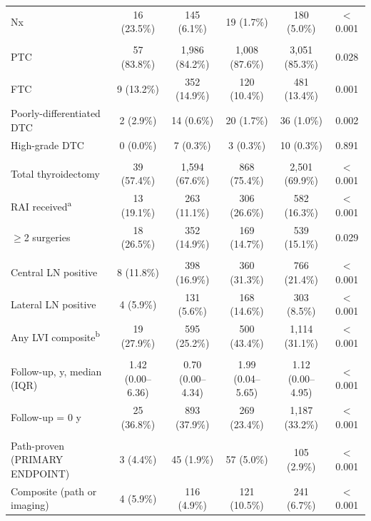 \begin{landscape}
\begin{table}[htbp]
\begin{threeparttable}
\begin{tabular}{@{}lccccc@{}}
\quad Nx & 16 (23.5\%) & 145 (6.1\%) & 19 (1.7\%) & 180 (5.0\%) & $<$0.001 \\
\addlinespace
\multicolumn{6}{l}{\textit{Histology}} \\
\quad PTC & 57 (83.8\%) & 1{,}986 (84.2\%) & 1{,}008 (87.6\%) & 3{,}051 (85.3\%) & 0.028 \\
\quad FTC & 9 (13.2\%) & 352 (14.9\%) & 120 (10.4\%) & 481 (13.4\%) & 0.001 \\
\quad Poorly-differentiated DTC & 2 (2.9\%) & 14 (0.6\%) & 20 (1.7\%) & 36 (1.0\%) & 0.002 \\
\quad High-grade DTC & 0 (0.0\%) & 7 (0.3\%) & 3 (0.3\%) & 10 (0.3\%) & 0.891 \\
\addlinespace
\multicolumn{6}{l}{\textit{Treatment}} \\
\quad Total thyroidectomy & 39 (57.4\%) & 1{,}594 (67.6\%) & 868 (75.4\%) & 2{,}501 (69.9\%) & $<$0.001 \\
\quad RAI received\textsuperscript{a} & 13 (19.1\%) & 263 (11.1\%) & 306 (26.6\%) & 582 (16.3\%) & $<$0.001 \\
\quad $\geq$2 surgeries & 18 (26.5\%) & 352 (14.9\%) & 169 (14.7\%) & 539 (15.1\%) & 0.029 \\
\addlinespace
\multicolumn{6}{l}{\textit{Lymph-node burden and lymphovascular invasion}} \\
\quad Central LN positive & 8 (11.8\%) & 398 (16.9\%) & 360 (31.3\%) & 766 (21.4\%) & $<$0.001 \\
\quad Lateral LN positive & 4 (5.9\%) & 131 (5.6\%) & 168 (14.6\%) & 303 (8.5\%) & $<$0.001 \\
\quad Any LVI composite\textsuperscript{b} & 19 (27.9\%) & 595 (25.2\%) & 500 (43.4\%) & 1{,}114 (31.1\%) & $<$0.001 \\
\addlinespace
\multicolumn{6}{l}{\textit{Follow-up}} \\
\quad Follow-up, y, median (IQR) & 1.42 (0.00--6.36) & 0.70 (0.00--4.34) & 1.99 (0.04--5.65) & 1.12 (0.00--4.95) & $<$0.001 \\
\quad Follow-up = 0 y & 25 (36.8\%) & 893 (37.9\%) & 269 (23.4\%) & 1{,}187 (33.2\%) & $<$0.001 \\
\addlinespace
\multicolumn{6}{l}{\textit{Recurrence}} \\
\quad Path-proven (PRIMARY ENDPOINT) & 3 (4.4\%) & 45 (1.9\%) & 57 (5.0\%) & 105 (2.9\%) & $<$0.001 \\
\quad Composite (path or imaging) & 4 (5.9\%) & 116 (4.9\%) & 121 (10.5\%) & 241 (6.7\%) & $<$0.001 \\
\bottomrule

\end{tabular}
\end{threeparttable}
\end{table}
\end{landscape}
